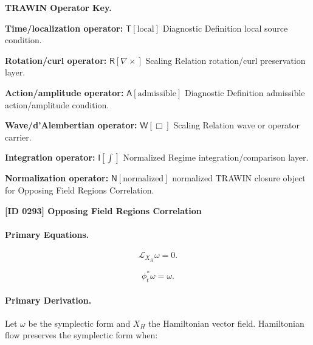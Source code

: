 \par\vspace{0.45\baselineskip}
\noindent\begin{minipage}[t]{\linewidth}
\begingroup
\small
\raggedright
\textbf{TRAWIN Operator Key.}\par
\noindent\textbf{Time/localization operator:} $\mathsf{T}\!\left[\mathrm{local}\right]$ Diagnostic Definition local source condition.\par
\noindent\textbf{Rotation/curl operator:} $\mathsf{R}\!\left[\nabla\times\right]$ Scaling Relation rotation/curl preservation layer.\par
\noindent\textbf{Action/amplitude operator:} $\mathsf{A}\!\left[\mathrm{admissible}\right]$ Diagnostic Definition admissible action/amplitude condition.\par
\noindent\textbf{Wave/d'Alembertian operator:} $\mathsf{W}\!\left[\Box\right]$ Scaling Relation wave or operator carrier.\par
\noindent\textbf{Integration operator:} $\mathsf{I}\!\left[\int\right]$ Normalized Regime integration/comparison layer.\par
\noindent\textbf{Normalization operator:} $\mathsf{N}\!\left[\mathrm{normalized}\right]$ normalized TRAWIN closure object for Opposing Field Regions Correlation.\par
\endgroup
\end{minipage}

\clearpage
\noindent\textbf{[ID 0293] Opposing Field Regions Correlation}\par
\vspace{0.35em}
\paragraph{Primary Equations.}
\begin{equation}
\mathcal{L}_{X_H}\omega=0.
\end{equation}

\begin{equation}
\phi_t^{*}\omega=\omega.
\end{equation}

\paragraph{Primary Derivation.}
Let $\omega$ be the symplectic form and $X_H$ the Hamiltonian vector field.  
Hamiltonian flow preserves the symplectic form when:

